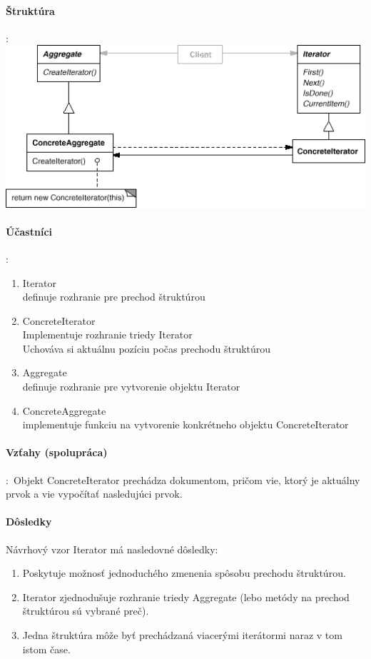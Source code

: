 			\paragraph{Štruktúra}:\\

				\includegraphics[width=.9\textwidth]{images/iterator3}

			\paragraph{Účastníci}:\\
				\begin{enumerate}
					\item Iterator\\
						definuje rozhranie pre prechod štruktúrou
					\item ConcreteIterator\\
						Implementuje rozhranie triedy Iterator\\
						Uchováva si aktuálnu pozíciu počas prechodu štruktúrou
					\item Aggregate\\
						definuje rozhranie pre vytvorenie objektu Iterator
					\item ConcreteAggregate\\
					implementuje funkciu na vytvorenie konkrétneho objektu ConcreteIterator
				\end{enumerate}
			\paragraph{Vzťahy (spolupráca)}:\
				Objekt ConcreteIterator prechádza dokumentom, pričom vie, ktorý je aktuálny prvok a vie vypočítať nasledujúci prvok.
			\paragraph{Dôsledky}
				Návrhový vzor Iterator má nasledovné dôsledky:
				\begin{enumerate}
					\item Poskytuje možnosť jednoduchého zmenenia spôsobu prechodu štruktúrou.
					\item Iterator zjednodušuje rozhranie triedy Aggregate (lebo metódy na prechod štruktúrou sú vybrané preč).
					\item Jedna štruktúra môže byť prechádzaná viacerými iterátormi naraz v tom istom čase.
				\end{enumerate}
